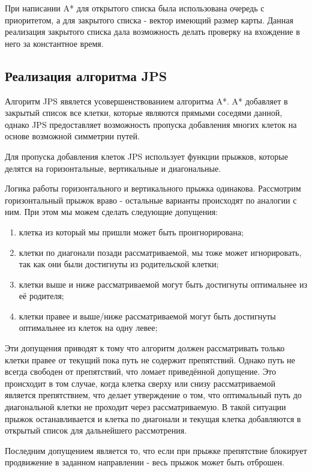 При написании A* для открытого списка была использована очередь с приоритетом, а для закрытого списка - вектор имеющий размер карты. Данная реализация закрытого списка дала возможность делать проверку на вхождение в него за константное время.

\subsection{Реализация алгоритма JPS}

Алгоритм JPS явялется усовершенствованием алгоритма A*. A* добавляет в закрытый список все клетки, которые являются прямыми соседями данной, однако JPS предоставляет возможность пропуска добавления многих клеток на основе возможной симметрии путей.

Для пропуска добавления клеток JPS использует функции прыжков, которые делятся на горизонтальные, вертикальные и диагональные.

Логика работы горизонтального и вертикального прыжка одинакова. Рассмотрим горизонтальный прыжок враво - остальные варианты происходят по аналогии с ним. При этом мы можем сделать следующие допущения:

\begin{enumerate}
    \item клетка из который мы пришли может быть проигнорирована;
    \item клетки по диагонали позади рассматриваемой, мы тоже может игнорировать, так как они были достигнуты из родительской клетки;
    \item клетки выше и ниже рассматриваемой могут быть достигнуты оптимальнее из её родителя;
    \item клетки правее и выше/ниже рассматриваемой могут быть достигнуты оптимальнее из клеток на одну левее;
\end{enumerate}

Эти допущения приводят к тому что алгоритм должен рассматривать только клетки правее от текущий пока путь не содержит препятствий. Однако путь не всегда свободен от препятствий, что ломает приведённой допущение. Это происходит в том случае, когда клетка сверху или снизу рассматриваемой является препятствием, что делает утверждение о том, что оптимальный путь до диагональной клетки не проходит через рассматриваемую. В такой ситуации прыжок останавливается и клетка по диагонали и текущая клетка добавляются в открытый список для дальнейшего рассмотрения. 

Последним допущением является то, что если при прыжке препятствие блокирует продвижение в заданном направлении - весь прыжок может быть отброшен.

